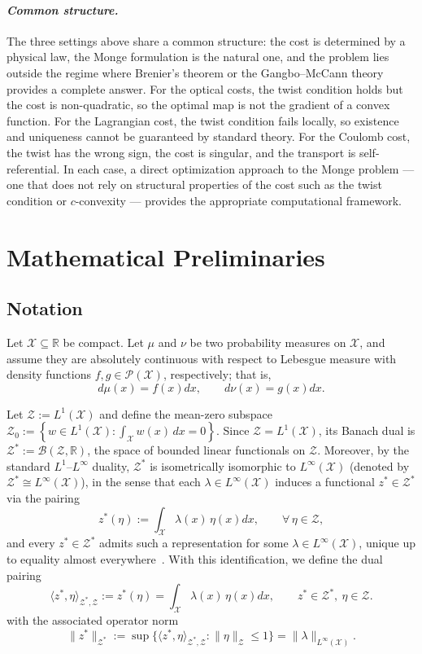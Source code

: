 \documentclass[12pt,leqno]{amsart}
\begin{document}
\paragraph{\it Common structure.}
The three settings above share a common structure: the cost is determined by a physical law, the Monge formulation is the natural one, and the problem lies outside the regime where Brenier's theorem or the Gangbo--McCann theory provides a complete answer. For the optical costs, the twist condition holds but the cost is non-quadratic, so the optimal map is not the gradient of a convex function. For the Lagrangian cost, the twist condition fails locally, so existence and uniqueness cannot be guaranteed by standard theory. For the Coulomb cost, the twist has the wrong sign, the cost is singular, and the transport is self-referential. In each case, a direct optimization approach to the Monge problem --- one that does not rely on structural properties of the cost such as the twist condition or $c$-convexity --- provides the appropriate computational framework.


\section{Mathematical Preliminaries}\label{sec:pre}
\subsection{Notation}\label{subsec:notation}
Let $\mathcal{X}\subseteq\mathbb R$ be compact. Let $\mu$ and $\nu$ be two probability measures on $\mathcal{X}$, and assume they are absolutely continuous
with respect to Lebesgue measure with density functions $f,g\in \mathcal{P}(\mathcal{X})$, respectively; that is,
\[
d\mu(x)=f(x)dx, \qquad d\nu(x)=g(x)dx.
\]

Let $\mathcal{Z} := L^1(\mathcal{X})$ and define the mean-zero subspace $\mathcal{Z}_0:= \left\{w \in L^1(\mathcal{X}):\int_{\mathcal{X}} w(x)\,dx = 0\right\}$. 
Since $\mathcal{Z} = L^1(\mathcal{X})$, its Banach dual is $\mathcal{Z}^* := \mathcal{B}(\mathcal{Z},\mathbb R)$, the space of bounded linear functionals on $\mathcal{Z}$.
Moreover, by the standard $L^1$--$L^\infty$ duality, $\mathcal{Z}^*$ is isometrically isomorphic to $L^\infty(\mathcal{X})$ (denoted by $\mathcal{Z}^* \cong L^\infty(\mathcal{X})$),
in the sense that each $\lambda\in L^\infty(\mathcal{X})$ induces a functional $z^* \in \mathcal{Z}^*$ via the pairing
\[
z^*(\eta) := \int_{\mathcal{X}} \lambda(x)\,\eta(x)dx, \qquad \forall\,\eta \in \mathcal{Z},
\]
and every $z^* \in \mathcal{Z}^*$ admits such a representation for some $\lambda\in L^\infty(\mathcal{X})$, unique up to equality almost everywhere~\citep[Theorem~6.15]{folland1999real}.
With this identification, we define the dual pairing
\[
\langle z^*,\eta\rangle_{\mathcal{Z}^*,\mathcal{Z}} := z^*(\eta) = \int_{\mathcal{X}} \lambda(x)\,\eta(x)dx, \qquad z^*\in \mathcal{Z}^*,\ \eta\in \mathcal{Z}.
\]
with the associated operator norm
\[
\|z^*\|_{\mathcal{Z}^*} := \sup\Big\{ \langle z^*,\eta\rangle_{\mathcal{Z}^*,\mathcal{Z}} : \|\eta\|_{\mathcal{Z}}\le 1\Big\} = \|\lambda\|_{L^\infty(\mathcal{X})}.
\]
\end{document}
